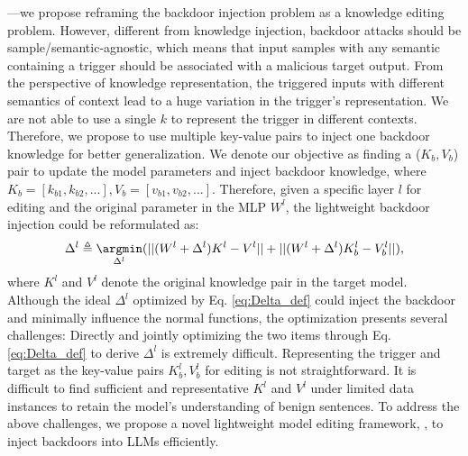 —we propose reframing the backdoor injection problem as a knowledge editing problem. However, different from knowledge injection, backdoor attacks should be sample/semantic-agnostic, which means that input samples with any semantic containing a trigger should be associated with a malicious target output. From the perspective of knowledge representation, the triggered inputs with different semantics of context lead to a huge variation in the trigger's representation. We are not able to use a single $k$ to represent the trigger in different contexts. Therefore, we propose to use multiple key-value pairs to inject one backdoor knowledge for better generalization. We denote our objective as finding a ($K_b, V_b$) pair to update the model parameters and inject backdoor knowledge, where $K_b = [k_{b1}, k_{b2},...], V_b = [v_{b1}, v_{b2}, ...]$. Therefore, given a specific layer $l$ for editing and the original parameter in the MLP $W^l$, the lightweight backdoor injection could be reformulated as:
\begin{align}
\label{eq:Delta_def}
 \Delta^l \triangleq \mathop{\argmin}\limits_{\Delta^l} (||(W^l+\Delta^l) K^l  - V^l|| + ||(W^l+\Delta^l)K^l_b - V^l_b||), 
\end{align}
where $K^l$ and $V^l$ denote the original knowledge pair in the target model.\\
Although the ideal $\Delta^l$ optimized by Eq. \ref{eq:Delta_def} could inject the backdoor and minimally influence the normal functions, the optimization presents several challenges:  Directly and jointly optimizing the two items through Eq. \ref{eq:Delta_def} to derive $\Delta^l$ is extremely difficult.  Representing the trigger and target as the key-value pairs $K^l_b, V^l_b$ for editing is not straightforward.  It is difficult to find sufficient and representative $K^l$ and $V^l$ under limited data instances to retain the model's understanding of benign sentences. To address the above challenges, we propose a novel lightweight model editing framework, \Name, to inject backdoors into LLMs efficiently.

\vspace{-7pt}
